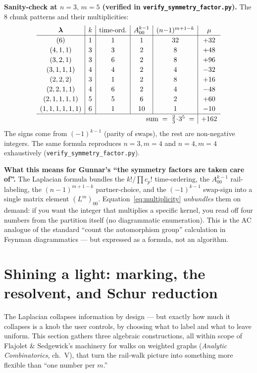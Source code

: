 \documentclass[11pt,a4paper]{article}
\begin{document}
\smallskip
\textbf{Sanity-check at $n=3,\,m=5$ (verified in
\texttt{verify\_symmetry\_factor.py}).}
The 8 chunk patterns and their multiplicities:
\[
\renewcommand{\arraystretch}{1.18}
\begin{array}{c|c|c|c|c|c}
\boldsymbol\lambda & k & \text{time-ord.} & A^{k-1}_{00} & (n{-}1)^{m+1-k} & \mu \\\hline
(6) & 1 & 1 & 1 & 32 & +32 \\
(4,1,1) & 3 & 3 & 2 & 8 & +48 \\
(3,2,1) & 3 & 6 & 2 & 8 & +96 \\
(3,1,1,1) & 4 & 4 & 2 & 4 & -32 \\
(2,2,2) & 3 & 1 & 2 & 8 & +16 \\
(2,2,1,1) & 4 & 6 & 2 & 4 & -48 \\
(2,1,1,1,1) & 5 & 5 & 6 & 2 & +60 \\
(1,1,1,1,1,1) & 6 & 1 & 10 & 1 & -10 \\\hline
\multicolumn{5}{r|}{\text{sum}\;=\;\frac{2}{3}\!\cdot\!3^{5}\;=} & +162
\end{array}
\]
The signs come from $(-1)^{k-1}$ (parity of swaps), the rest are
non-negative integers. The same formula reproduces $n{=}3, m{=}4$ and
$n{=}4, m{=}4$ exhaustively (\texttt{verify\_symmetry\_factor.py}).

\smallskip
\textbf{What this means for Gunnar's
``the symmetry factors are taken care of''.}
The Laplacian formula bundles the $k!/\prod c_p!$ time-ordering, the
$A_{00}^{k-1}$ rail-labeling, the $(n-1)^{m+1-k}$ partner-choice, and
the $(-1)^{k-1}$ swap-sign into a single matrix element $(L^m)_{00}$.
Equation~\eqref{eq:multiplicity} \emph{unbundles} them on demand: if
you want the integer that multiplies a specific kernel, you read off
four numbers from the partition itself (no diagrammatic enumeration).
This is the AC analogue of the standard ``count the automorphism
group'' calculation in Feynman diagrammatics --- but expressed as a
formula, not an algorithm.

\section{Shining a light: marking, the resolvent, and Schur reduction}\label{sec:marking}

The Laplacian collapses information by design --- but exactly how much it
collapses is a knob the user controls, by choosing what to label and what
to leave uniform. This section gathers three algebraic constructions, all
within scope of Flajolet \& Sedgewick's machinery for walks on weighted
graphs (\emph{Analytic Combinatorics}, ch.\ V), that turn the rail-walk
picture into something more flexible than ``one number per $m$.''
\end{document}
